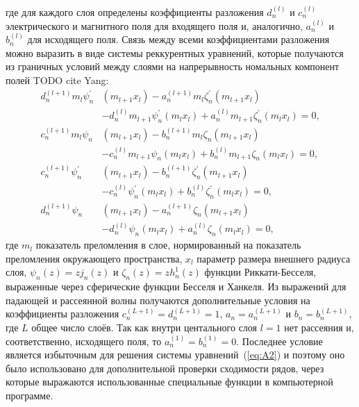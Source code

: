 где для каждого слоя определены коэффициенты разложения $d_n^{(l)}$ и
$c_n^{(l)}$ электрического и магнитного поля для входящего поля и,
аналогично, $a_n^{(l)}$ и $b_n^{(l)}$ для исходящего поля.  Связь
между всеми коэффициентами разложения можно выразить в виде системы
реккурентных уравнений, которые получаются из граничных условий между
слоями на напрерывность номальных компонент полей TODO cite Yang:
\begin{equation} %
  \label{eq:A2}
    \begin{alignedat}{2}
d^{(l+1)}_{n}m_{l} \psi^{\prime}_{n}&{\left (m_{l+1} x_{l} \right )}
- a^{(l+1)}_{n} m_{l} \zeta^{\prime}_{n}{\left (m_{l+1} x_{l} \right )}\\
& - d^{(l)}_{n} m_{l+1} \psi^{\prime}_{n}{\left (m_{l} x_{l} \right )} 
+ a^{(l)}_{n} m_{l+1} \zeta^{\prime}_{n}{\left (m_{l} x_{l} \right )} = 0,\\
c^{(l+1)}_{n} m_{l} \psi_{n}&{\left (m_{l+1} x_{l} \right )}
  - b^{(l+1)}_{n} m_{l} \zeta_{n}{\left (m_{l+1} x_{l} \right )}\\
&- c^{(l)}_{n} m_{l+1} \psi_{n}{\left (m_{l} x_{l} \right )} 
+b^{(l)}_{n} m_{l+1} \zeta_{n}{\left (m_{l} x_{l} \right )}  =0,\\
c^{(l+1)}_{n} \psi^{\prime}_{n}&{\left (m_{l+1} x_{l} \right )}
- b^{(l+1)}_{n} \zeta^{\prime}_{n}{\left (m_{l+1} x_{l} \right )}\\
&- c^{(l)}_{n} \psi^{\prime}_{n}{\left (m_{l} x_{l} \right )} 
+b^{(l)}_{n} \zeta^{\prime}_{n}{\left (m_{l} x_{l} \right )}   =0,\\
 d^{(l+1)}_{n} \psi_{n}&{\left (m_{l+1} x_{l} \right )}
- a^{(l+1)}_{n} \zeta_{n}{\left (m_{l+1} x_{l} \right )}\\
& - d^{(l)}_{n} \psi_{n}{\left (m_{l} x_{l} \right )} 
+ a^{(l)}_{n} \zeta_{n}{\left (m_{l} x_{l} \right )}   =0,
\end{alignedat}
\end{equation}
где $m_l$ показатель преломления в слое, нормированный на показатель
преломления окружающего пространства, $x_l$ параметр размера внешнего
радиуса слоя, $\psi_{n}(z) = z j_n(z)$ и $\zeta_{n}(z) = z h_n^1(z)$
функции Риккати-Бесселя, выраженные через сферические функции Бесселя
и Ханкеля.  Из выражений для падающей и рассеянной волны получаются
дополнительные условия на коэффициенты разложения
$c_n^{(L+1)}=d_n^{(L+1)}=1$, $a_n=a_n^{(L+1)}$ и $b_n=b_n^{(L+1)}$,
где $L$ общее число слоёв. Так как внутри центального слоя $l=1$ нет
рассеяния и, соответственно, исходящего поля, то
$a_n^{(1)}=b_n^{(1)}=0$. Последнее условие является избыточным для
решения системы уравнений~(\ref{eq:A2}) и поэтому оно было
использовано для дополнительной проверки сходимости рядов, через
которые выражаются использованные специальные функции в компьютерной
программе.








